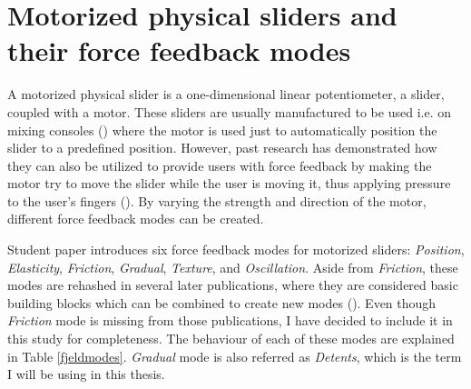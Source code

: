\section{Motorized physical sliders and their force feedback modes}

A motorized physical slider is a one-dimensional linear potentiometer, a slider, coupled with a motor. These sliders are usually manufactured to be used i.e. on mixing consoles (\cite{bourns2020}) where the motor is used just to automatically position the slider to a predefined position. However, past research has demonstrated how they can also be utilized to provide users with force feedback by making the motor try to move the slider while the user is moving it, thus applying pressure to the user's fingers (\cite{bak2015, beamish2004, berdahl-kontogeorgakopoulos2013, gillespie-rosenberg1995, papetti2018,kontogeorgakopoulos2019}). By varying the strength and direction of the motor, different force feedback modes can be created.

Student paper \textcite{kretz2004} introduces six force feedback modes for motorized sliders: \textit{Position}, \textit{Elasticity}, \textit{Friction}, \textit{Gradual}, \textit{Texture}, and \textit{Oscillation}. Aside from \textit{Friction}, these modes are rehashed in several later publications, where they are considered basic building blocks which can be combined to create new modes (\cite{jenaro2007, kretz2005, shahrokni2006}). Even though \textit{Friction} mode is missing from those publications, I have decided to include it in this study for completeness. The behaviour of each of these modes are explained in Table \ref{fjeldmodes}. \textit{Gradual} mode is also referred as \textit{Detents}, which is the term I will be using in this thesis.


